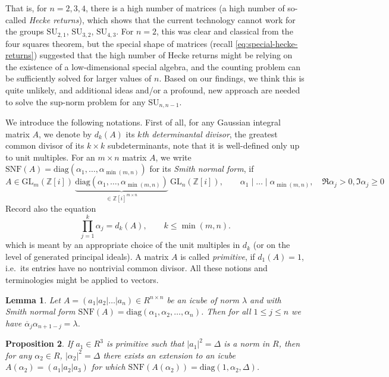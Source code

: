 \documentclass[11pt]{amsart}
\newcommand{\diag}{\mathrm{diag}}
\newcommand{\SNF}{\mathrm{SNF}}
\newcommand{\ZZ}{\mathbb{Z}}
\newtheorem{proposition}{Proposition}[section]
\newtheorem{lemma}[proposition]{Lemma}
\theoremstyle{definition}
\theoremstyle{remark}
\begin{document}
That is, for $n=2,3,4$, there is a high number of matrices (a high number of so-called \emph{Hecke returns}), which shows that the current technology cannot work for the groups $\mathrm{SU}_{2,1}$, $\mathrm{SU}_{3,2}$, $\mathrm{SU}_{4,3}$. For $n=2$, this was clear and classical from the four squares theorem, but the special shape of matrices (recall \eqref{eq:special-hecke-returns}) suggested that the high number of Hecke returns might be relying on the existence of a low-dimensional special algebra, and the counting problem can be sufficiently solved for larger values of $n$. Based on our findings, we think this is quite unlikely, and additional ideas and/or a profound, new approach are needed to solve the sup-norm problem for any $\mathrm{SU}_{n,n-1}$.

We introduce the following notations. First of all, for any Gaussian integral matrix $A$, we denote by $d_k(A)$ its \emph{$k$th determinantal divisor}, the greatest common divisor of its $k\times k$ subdeterminants, note that it is well-defined only up to unit multiples. For an $m\times n$ matrix $A$, we write $\SNF(A)=\diag(\alpha_1,\dotsc,\alpha_{\min(m,n)})$ for its \emph{Smith normal form}, if
\[
A\in \mathrm{GL}_m(\ZZ[i])\ \underbrace{\diag(\alpha_1,\dotsc,\alpha_{\min(m,n)})}_{\in\ZZ[i]^{m\times n}}\ \mathrm{GL}_n(\ZZ[i]), \qquad \alpha_1\mid \dotsc \mid \alpha_{\min(m,n)},\quad \Re\alpha_j> 0, \Im \alpha_j\geq 0
\]
Record also the equation
\[
\prod_{j=1}^k \alpha_j = d_k(A), \qquad k\leq \min(m,n).
\]
which is meant by an appropriate choice of the unit multiples in $d_k$ (or on the level of generated principal ideals). A matrix $A$ is called \emph{primitive}, if $d_1(A)=1$, i.e.~its entries have no nontrivial common divisor. All these notions and terminologies might be applied to vectors.


\begin{lemma}\label{SNFlemma}
Let $A=(a_1|a_2|\dots|a_n)\in R^{n\times n}$ be an icube of norm $\lambda$ and with Smith normal form $\SNF(A)=\diag(\alpha_1,\alpha_2,\dots,\alpha_n)$. Then for all $1\leq j\leq n$ we have $\overline\alpha_j\alpha_{n+1-j}=\lambda$.
\end{lemma}

\begin{proposition}\label{3Zip}
If $a_1\in R^3$ is primitive such that $|a_1|^2=\Delta$ is a norm in $R$, then for any $\alpha_2\in R$, $|\alpha_2|^2=\Delta$ there exists an extension to an icube $A(\alpha_2)=(a_1|a_2|a_3)$ for which $\SNF(A(\alpha_2))=\diag(1,\alpha_2,\Delta)$.
\end{proposition}
\end{document}
